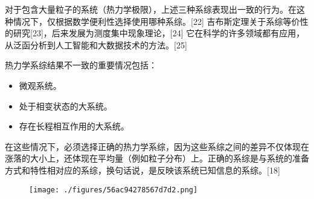 对于包含大量粒子的系统（热力学极限），上述三种系综表现出一致的行为。在这种情况下，仅根据数学便利性选择使用哪种系综。[22] 吉布斯定理关于系综等价性的研究[23]，后来发展为测度集中现象理论，[24] 它在科学的许多领域都有应用，从泛函分析到人工智能和大数据技术的方法。[25]  

热力学系综结果不一致的重要情况包括：
\begin{itemize}
\item 微观系统。  
\item 处于相变状态的大系统。  
\item 存在长程相互作用的大系统。
\end{itemize}  
在这些情况下，必须选择正确的热力学系综，因为这些系综之间的差异不仅体现在涨落的大小上，还体现在平均量（例如粒子分布）上。正确的系综是与系统的准备方式和特性相对应的系综，换句话说，是反映该系统已知信息的系综。[18]
\begin{figure}[ht]
\centering
\texttt{[image: ./figures/56ac94278567d7d2.png]}
\caption{} \label{fig_TJLX_2}
\end{figure}
